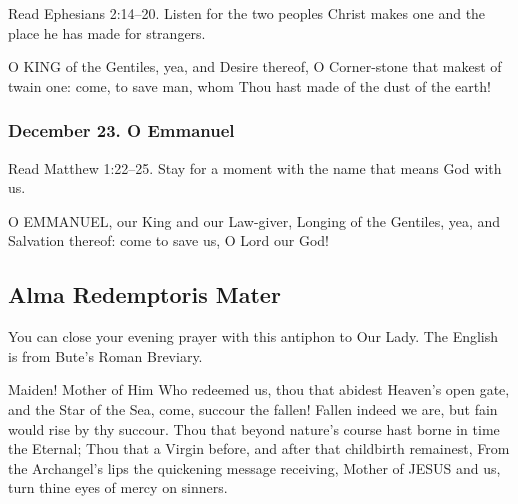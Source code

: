 Read Ephesians 2:14--20. Listen for the two peoples Christ makes one and the place he has made for strangers.

O KING of the Gentiles, yea, and Desire thereof, O Corner-stone that makest of twain one: come, to save man, whom Thou hast made of the dust of the earth!

\subsubsection*{December 23. O Emmanuel}

Read Matthew 1:22--25. Stay for a moment with the name that means God with us.

O EMMANUEL, our King and our Law-giver, Longing of the Gentiles, yea, and Salvation thereof: come to save us, O Lord our God!

\subsection{Alma Redemptoris Mater}

You can close your evening prayer with this antiphon to Our Lady.
The English is from Bute's Roman Breviary.

Maiden! Mother of Him Who redeemed us, thou that abidest Heaven’s open gate, and the Star of the Sea, come, succour the fallen! Fallen indeed we are, but fain would rise by thy succour. Thou that beyond nature’s course hast borne in time the Eternal; Thou that a Virgin before, and after that childbirth remainest, From the Archangel’s lips the quickening message receiving, Mother of JESUS and us, turn thine eyes of mercy on sinners.
